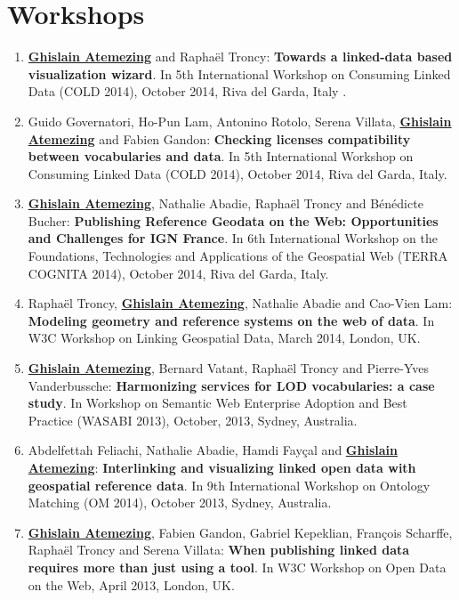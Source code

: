 \section*{Workshops}\label{sec:workshop}
\begin{enumerate}
\item \underline{\textbf{Ghislain Atemezing}} and Rapha{\"e}l Troncy: \textbf{{T}owards a linked-data based visualization wizard}. In 5th {I}nternational {W}orkshop on {C}onsuming {L}inked {D}ata (COLD 2014), {O}ctober 2014, {R}iva del {G}arda, {I}taly .

 \item {G}uido {G}overnatori, {H}o-{P}un {L}am, {A}ntonino {R}otolo, {S}erena {V}illata, \underline{\textbf{{G}hislain {A}temezing}} and {F}abien {G}andon: \textbf{{C}hecking licenses compatibility between vocabularies and data}. In 5th {I}nternational {W}orkshop on {C}onsuming {L}inked {D}ata (COLD 2014), {O}ctober 2014, {R}iva del {G}arda, {I}taly.

 \item \underline{\textbf{{G}hislain {A}temezing}}, {N}athalie {A}badie, {R}apha{\"e}l {T}roncy and {B}{\'e}n{\'e}dicte {B}ucher: \textbf{{P}ublishing Reference Geodata on the Web: {O}pportunities and Challenges for {IGN} {F}rance}. In 6th {I}nternational {W}orkshop on the {F}oundations, {T}echnologies and {A}pplications of the {G}eospatial {W}eb (TERRA COGNITA 2014), {O}ctober 2014, {R}iva del {G}arda, {I}taly.
 \item Rapha{\"e}l Troncy, \underline{\textbf{Ghislain Atemezing}}, Nathalie Abadie and Cao-Vien Lam: \textbf{Modeling geometry and reference systems on the web of data}. In W3C Workshop on Linking Geospatial Data, March 2014, London, UK.

 \item \underline{\textbf{Ghislain Atemezing}}, Bernard Vatant, Rapha{\"e}l Troncy and Pierre-Yves Vanderbussche: \textbf{Harmonizing services for LOD vocabularies: a case study}. In Workshop on Semantic Web Enterprise Adoption and Best Practice (WASABI 2013), October, 2013, Sydney, Australia.

 \item Abdelfettah Feliachi, Nathalie Abadie, Hamdi Fay\c cal and \underline{\textbf{Ghislain Atemezing}}: \textbf{{I}nterlinking and visualizing linked open data with geospatial reference data}. In 9th International Workshop on Ontology Matching (OM 2014), October 2013, Sydney, Australia.

 \item \underline{\textbf{Ghislain Atemezing}}, Fabien Gandon, Gabriel Kepeklian, Fran\c{c}ois Scharffe, Rapha{\"e}l Troncy and Serena Villata: \textbf{When publishing linked data requires more than just using a tool}. In W3C Workshop on Open Data on the Web, April 2013, London, UK.


\end{enumerate}

